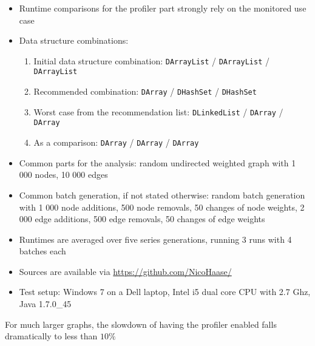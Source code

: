 	\begin{itemize}
		\item Runtime comparisons for the profiler part strongly rely on the monitored use
			case
		\item Data structure combinations:
		\begin{enumerate}
			\item Initial data structure combination: \texttt{DArrayList} / \texttt{DArrayList} /
			\texttt{DArrayList}
			\item Recommended combination: \texttt{DArray} / \texttt{DHashSet} / \texttt{DHashSet}
			\item Worst case from the recommendation list:
				\texttt{DLinkedList} / \texttt{DArray} / \texttt{DArray}
			\item As a comparison: \texttt{DArray} / \texttt{DArray} / \texttt{DArray}
		\end{enumerate}

		\item Common parts for the analysis: random undirected weighted graph with 1 000 nodes,
			10 000 edges
		\item Common batch generation, if not stated otherwise: random batch generation with
			1 000 node additions, 500 node removals, 50 changes of node weights, 2 000 edge
			additions, 500 edge removals, 50 changes of edge weights
		\item Runtimes are averaged over five series generations, running 3 runs with 4 batches
			each
		\item Sources are available via \url{https://github.com/NicoHaase/}
		\item Test setup: Windows 7 on a Dell laptop, Intel i5 dual core CPU with 2.7 Ghz, Java
			1.7.0\_45
	\end{itemize}	
	
	For much larger graphs, the slowdown of having the profiler enabled falls dramatically to
	less than $10 \%$
